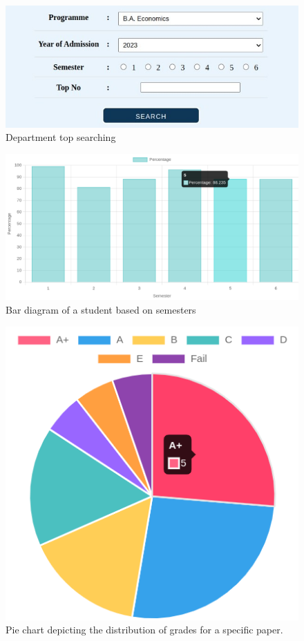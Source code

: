 \documentclass{nascproject}
\begin{document}
\begin{figure}
	\centering
	\includegraphics[width=1\linewidth]{top.jpeg}
	\caption{Department top searching}
	\label{dept_top}
\end{figure}

\begin{figure}
	\centering
	\includegraphics[width=1\linewidth]{bar_diagram.png}
	\caption{Bar diagram of a student based on semesters}
	\label{graph}
\end{figure}

\begin{figure}
	\centering
	\includegraphics[width=0.5\linewidth]{pie1.png}
	\caption{Pie chart depicting the distribution of grades for a specific paper.}
	\label{pie}
\end{figure}
\end{document}
